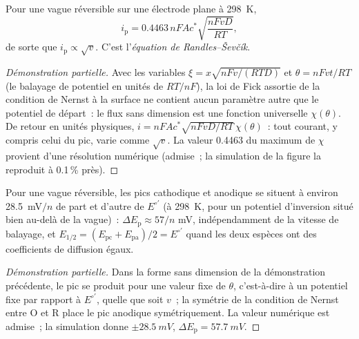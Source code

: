 \begin{proposition}\label{prop:b3:electrode-kinetics:randles-sevcik}
Pour une vague réversible sur une électrode plane à \qty{298}{K},
\[
  i_{\mathrm p} = 0.4463\,nFAc^*\sqrt{\frac{nFvD}{RT}},
\]
de sorte que $i_{\mathrm p} \propto \sqrt v$. C'est l'\emph{équation de Randles--Ševčík}.
\end{proposition}

\begin{proof}[Démonstration partielle]
Avec les variables $\xi = x\sqrt{nFv/(RTD)}$ et $\theta = nFvt/RT$ (le
balayage de potentiel en unités de
$RT/nF$), la loi de Fick assortie de la condition de Nernst à la surface
ne contient aucun paramètre autre que le potentiel de départ~: le flux
sans dimension est une fonction universelle $\chi(\theta)$. De retour
en unités physiques, $i = nFAc^*\sqrt{nFvD/RT}\,\chi(\theta)$~: tout
courant, y compris celui du pic, varie comme $\sqrt v$. La valeur 0.4463
du maximum de
$\chi$ provient d'une résolution numérique (admise~; la simulation de la
figure la reproduit à 0.1\,\% près).
\end{proof}

\begin{proposition}\label{prop:b3:electrode-kinetics:delta-ep}
Pour une vague réversible, les pics cathodique et anodique se situent à
environ \qty{28.5}{mV}$/n$
de part et d'autre de $E^{\circ\prime}$ (à \qty{298}{K}, pour un
potentiel d'inversion situé bien au-delà de la vague)~:
$\Delta E_{\mathrm p} \approx 57/n$ mV, indépendamment de la vitesse de
balayage, et $E_{1/2} = (E_{\mathrm{pc}} + E_{\mathrm{pa}})/2 =
E^{\circ\prime}$ quand les deux espèces ont des coefficients de diffusion
égaux.
\end{proposition}

\begin{proof}[Démonstration partielle]
Dans la forme sans dimension de la démonstration précédente, le pic se
produit pour une valeur fixe de $\theta$, c'est-à-dire à un potentiel
fixe par rapport à $E^{\circ\prime}$, quelle que soit $v$~; la symétrie
de la condition de Nernst entre O et R place le pic anodique
symétriquement. La valeur numérique est admise~; la simulation donne
$\pm\qty{28.5}{mV}$, $\Delta E_{\mathrm p} = \qty{57.7}{mV}$.
\end{proof}

